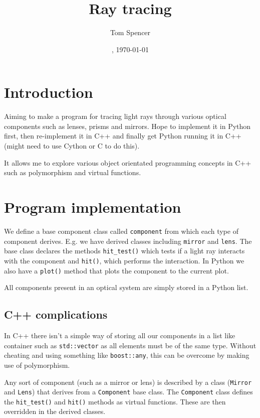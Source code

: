 \documentclass{article}
\title{Ray tracing}
\author{Tom Spencer}
\date{\currenttime, \today}
\begin{document}

\maketitle

\section{Introduction}
Aiming to make a program for tracing light rays through various optical components such as lenses, prisms and mirrors. Hope to implement it in Python first, then re-implement it in C++ and finally get Python running it in C++ (might need to use Cython or C to do this).

It allows me to explore various object orientated programming concepts in C++ such as polymorphism and virtual functions.

\section{Program implementation}
We define a base component class called \texttt{component} from which each type of component derives. E.g. we have derived classes including \texttt{mirror} and \texttt{lens}. The base class declares the methods \texttt{hit\_test()} which tests if a light ray interacts with the component and \texttt{hit()}, which performs the interaction. In Python we also have a \texttt{plot()} method that plots the component to the current plot.

All components present in an optical system are simply stored in a Python list.

\subsection{C++ complications}
In C++ there isn't a simple way of storing all our components in a list like container such as \texttt{std::vector} as all elements must be of the same type. Without cheating and using something like \texttt{boost::any}, this can be overcome by making use of polymorphism.

Any sort of component (such as a mirror or lens) is described by a class (\texttt{Mirror} and \texttt{Lens}) that derives from a \texttt{Component} base class. The \texttt{Component} class defines the \texttt{hit\_test()} and \texttt{hit()} methods as virtual functions. These are then overridden in the derived classes.
\end{document}
